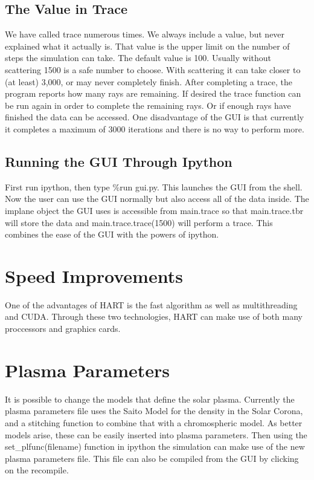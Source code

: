 \documentclass[12pt]{article}
\begin{document}
\subsection{The Value in Trace}
We have called trace numerous times. We always include a value, but
never explained what it actually is. That value is the upper limit on
the number of steps the simulation can take. The default value is
100. Usually without scattering 1500 is a safe number to choose. With
scattering it can take closer to (at least) 3,000, or may never completely
finish. After completing a trace, the program reports how many rays
are remaining. If desired the trace function can be run again in order
to complete the remaining rays. Or if enough rays have finished the
data can be accessed. One disadvantage of the GUI is that currently it
completes a maximum of 3000 iterations and there is no way to perform
more.

\subsection{Running the GUI Through Ipython}
First run ipython, then type \%run gui.py. This launches the GUI from
the shell. Now the user can use the GUI normally but also access all
of the data inside. The implane object the GUI uses is accessible from
main.trace so that main.trace.tbr will store the data and
main.trace.trace(1500) will perform a trace. This combines the ease of
the GUI with the powers of ipython.

\section{Speed Improvements}
One of the advantages of HART is the fast algorithm as well as
multithreading and CUDA. Through these two technologies, HART can make
use of both many proccessors and graphics cards.

\section{Plasma Parameters}
It is possible to change the models that define the solar
plasma. Currently the plasma parameters file uses the Saito Model for
the density in the Solar Corona, and a stitching function to combine
that with a chromospheric model. As better models arise, these can be
easily inserted into plasma parameters. Then using the
set\_plfunc(filename) function in ipython the simulation can make use
of the new plasma parameters file. This file can also be compiled from 
the GUI by clicking on the recompile.
\end{document}
